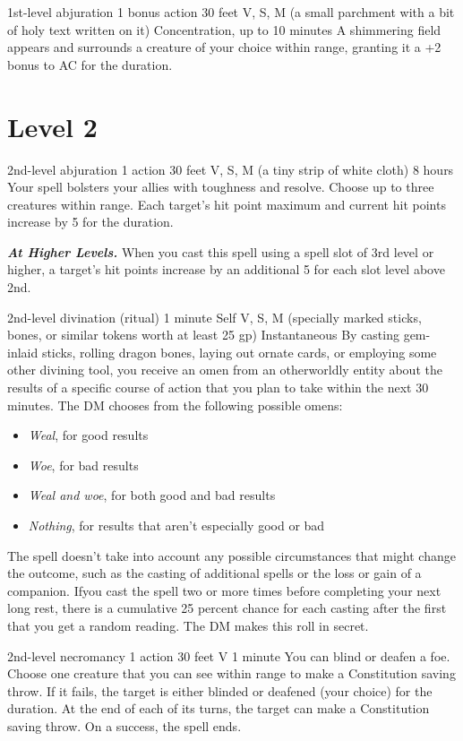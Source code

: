 \documentclass[10pt,twoside,twocolumn,openany]{book}
\newcommand\impact[1]{
	\textbf{\textit{#1}}
}
\begin{document}
{1st-level abjuration}
{\color{bonusaction}1 bonus action}
{30 feet}
{V, S, M (a small parchment with a bit of holy text written on it)}
{{\color{concentration}Concentration}, up to 10 minutes}
%
A shimmering field appears and surrounds a creature of your choice within range, granting it a +2 bonus to AC for the duration.

\newpage
\section{Level 2}
{2nd-level abjuration}
{\color{action}1 action}
{30 feet}
{V, S, M (a tiny strip of white cloth)}
{8 hours}
%
Your spell bolsters your allies with toughness and resolve. Choose up to three creatures within range. Each target's hit point maximum and current hit points increase by 5 for the duration.

\impact{At Higher Levels.} When you cast this spell using
a spell slot of 3rd level or higher, a target's hit points increase by an additional 5 for each slot level above 2nd.

{2nd-level divination {\color{ritual}(ritual)}}
{1 minute}
{Self}
{V, S, M (specially marked sticks, bones, or similar tokens worth at least {\color{cost}25 gp})}
{Instantaneous}
%
By casting gem-inlaid sticks, rolling dragon bones, laying out ornate cards, or employing some other divining tool, you receive an omen from an otherworldly entity about the results of a specific course of action that you plan to take within the next 30 minutes. The DM chooses from the following possible omens:
\begin{itemize}
  \item \emph{Weal}, for good results
  \item \emph{Woe}, for bad results
  \item \emph{Weal and woe}, for both good and bad results
  \item \emph{Nothing}, for results that aren't especially good or bad
\end{itemize}
The spell doesn't take into account any possible circumstances that might change the outcome, such as the casting of additional spells or the loss or gain of a companion.
Ifyou cast the spell two or more times before completing your next long rest, there is a cumulative 25 percent chance for each casting after the first that you get a random reading. The DM makes this roll in secret.

{2nd-level necromancy}
{\color{action}1 action}
{30 feet}
{V}
{1 minute}
%
You can blind or deafen a foe. Choose one creature that you can see within range to make a Constitution saving throw. If it fails, the target is either blinded or deafened (your choice) for the duration. At the end of each of its turns, the target can make a Constitution saving throw. On a success, the spell ends.
\end{document}
